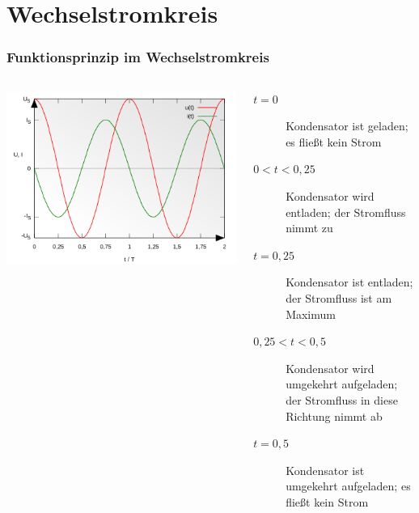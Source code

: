 \section{Wechsel\-strom\-kreis}
\begin{frame}
  \frametitle{Funktionsprinzip im Wechselstromkreis}
  \begin{columns}
      \includegraphics[width=1\textwidth]{e05/Sinus_Voltage_and_Current_of_a_Capacitor.png}\footnotemark
    {\small
    \begin{block}{}
    \begin{description}
      \item[$t=0$] Kondensator ist geladen; es fließt kein Strom
      \item[$0<t<0,25$] Kondensator wird entladen; der Stromfluss nimmt zu
      \item[$t=0,25$] Kondensator ist entladen; der Stromfluss ist am Maximum 
      \item[$0,25<t<0,5$] Kondensator wird umgekehrt aufgeladen; der Stromfluss in diese Richtung nimmt ab
      \item[$t=0,5$] Kondensator ist umgekehrt aufgeladen; es fließt kein Strom
    \end{description}
    \end{block}
    }
  \end{columns}
\end{frame}

